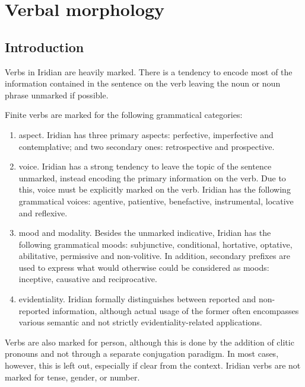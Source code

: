 \chapter{Verbal morphology}

\section{Introduction}


Verbs in Iridian are heavily marked. There is a tendency to encode most of the information contained in the sentence on the verb leaving the noun or noun phrase unmarked if possible.

\par Finite verbs are marked for the following grammatical categories:
\begin{enumerate}[nosep]
	\item {\cscaps aspect}. Iridian has three primary aspects: perfective, imperfective and contemplative; and two secondary ones: retrospective and prospective.
	\item {\cscaps voice}. Iridian has a strong tendency to leave the topic of the sentence unmarked, instead encoding the primary information on the verb. Due to this, voice must be explicitly marked on the verb. Iridian has the following grammatical voices: agentive, patientive, benefactive, instrumental, locative and reflexive.
	\item {\cscaps mood and modality}. Besides the unmarked indicative, Iridian has the following grammatical moods: subjunctive, conditional, hortative, optative, abilitative, permissive and non-volitive. In addition, secondary prefixes are used to express what would otherwise could be considered as moods: inceptive, causative and reciprocative.
	\item {\cscaps evidentiality}. Iridian formally distinguishes between reported and non-reported information, although actual usage of the former often encompasses various semantic and not strictly evidentiality-related applications.
\end{enumerate}

Verbs are also marked for person, although this is done by the addition of clitic pronouns and not through a separate conjugation paradigm. In most cases, however, this is left out, especially if clear from the context. Iridian verbs are not marked for tense, gender, or number.

